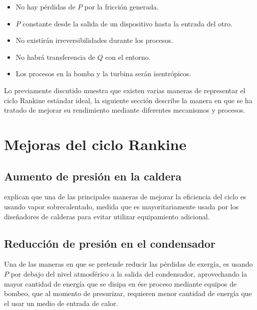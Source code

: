 \begin{itemize}
    \item No hay pérdidas de \( P \) por la fricción generada.
    \item \( P \) constante desde la salida de un dispositivo hasta la entrada del otro.
    \item No existirán irreversibilidades durante los procesos.
    \item No habrá transferencia de \( Q \) con el entorno.
    \item Los procesos en la bomba y la turbina serán isentrópicos.
\end{itemize}




Lo previamente discutido muestra que existen varias maneras de representar el ciclo Rankine estándar ideal, la siguiente sección describe la manera en que se ha tratado de mejorar su rendimiento mediante diferentes mecanismos y procesos.





\section{Mejoras del ciclo Rankine}

\subsection{Aumento de presión en la caldera}

\textcite{shapirotermo} explican que una de las principales maneras de mejorar la eficiencia del ciclo es usando vapor sobrecalentado, medida que es mayoritariamente usada por los diseñadores de calderas para evitar utilizar equipamiento adicional.

\subsection{Reducción de presión en el condensador} %
\label{sub:Reducción condensador}

Una de las maneras en que se pretende reducir las pérdidas de exergía, es usando $P$ por debajo del nivel atmosférico a la salida del condensador, \textcite{rajput2009engineering} aprovechando la mayor cantidad de energía que se disipa en ése proceso mediante equipos de bombeo, que al momento de presurizar, requieren menor cantidad de energía que el usar un medio de entrada de calor.


